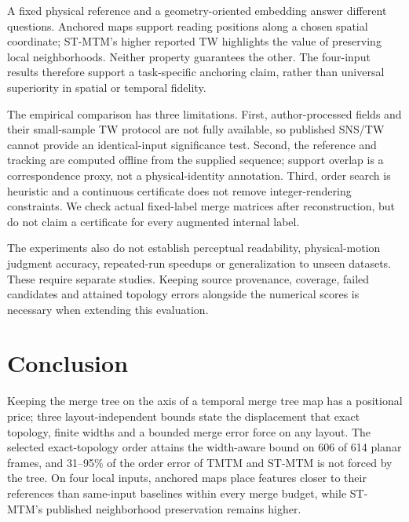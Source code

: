 \documentclass[review]{vgtc}
\begin{document}
A fixed physical reference and a geometry-oriented embedding answer different questions. Anchored maps support reading positions along a chosen spatial coordinate; ST-MTM's higher reported TW highlights the value of preserving local neighborhoods. Neither property guarantees the other. The four-input results therefore support a task-specific anchoring claim, rather than universal superiority in spatial or temporal fidelity.

The empirical comparison has three limitations. First, author-processed fields and their small-sample TW protocol are not fully available, so published SNS/TW cannot provide an identical-input significance test. Second, the reference and tracking are computed offline from the supplied sequence; support overlap is a correspondence proxy, not a physical-identity annotation. Third, order search is heuristic and a continuous certificate does not remove integer-rendering constraints. We check actual fixed-label merge matrices after reconstruction, but do not claim a certificate for every augmented internal label.

The experiments also do not establish perceptual readability, physical-motion judgment accuracy, repeated-run speedups or generalization to unseen datasets. These require separate studies. Keeping source provenance, coverage, failed candidates and attained topology errors alongside the numerical scores is necessary when extending this evaluation.
\section{Conclusion}
Keeping the merge tree on the axis of a temporal merge tree map has a positional price; three layout-independent bounds state the displacement that exact topology, finite widths and a bounded merge error force on any layout. The selected exact-topology order attains the width-aware bound on 606 of 614 planar frames, and 31--95\% of the order error of TMTM and ST-MTM is not forced by the tree. On four local inputs, anchored maps place features closer to their references than same-input baselines within every merge budget, while ST-MTM's published neighborhood preservation remains higher.
\FloatBarrier
\begingroup
{}


\endgroup
\end{document}
